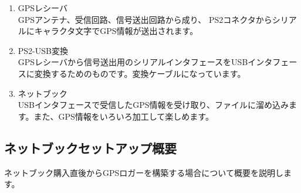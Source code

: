 \documentclass[mingoth,a4paper]{jsarticle}
\begin{document}
\begin{enumerate}
 \item GPSレシーバ \\
            GPSアンテナ、受信回路、信号送出回路から成り、 PS2コネクタからシリアルにキャラクタ文字でGPS情報が送出されます。
 \item PS2-USB変換 \\
            GPSレシーバから信号送出用のシリアルインタフェースをUSBインタフェースに変換するためのものです。変換ケーブルになっています。
 \item ネットブック \\
            USBインタフェースで受信したGPS情報を受け取り、ファイルに溜め込みます。また、GPS情報をいろいろ加工して楽しめます。
\end{enumerate}

\subsection{ネットブックセットアップ概要}
ネットブック購入直後からGPSロガーを構築する場合について概要を説明します。
\end{document}
